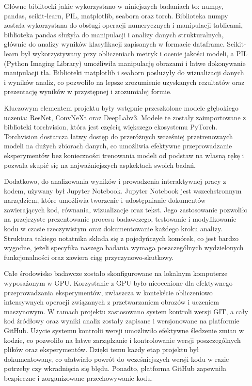 Główne biblitoeki jakie wykorzystano w niniejszych badaniach to: numpy, pandas, scikit-learn, PIL, matplotlib, seaborn oraz torch. Biblioteka numpy została wykorzystana do obsługi operacji numerycznych i manipulacji tablicami, biblioteka 
pandas służyła do manipulacji i analizy danych strukturalnych, głównie do analizy wyników klasyfikacji zapisanych w formacie dataframe. Scikit-learn był wykorzystywany przy obliczeniach metryk i ocenie jakości modeli, a PIL 
(Python Imaging Library) umożliwiła manipulację obrazami i łatwe dokonywanie manipulacji tła. Biblioteki matplotlib i seaborn posłużyły do wizualizacji danych i wyników analiz, co pozwoliło na lepsze zrozumienie uzyskanych rezultatów oraz 
prezentację wyników w przystępnej i zrozumiałej formie.

Kluczowym elementem projektu były wstępnie przeszkolone modele głębokiego uczenia: ResNet, ConvNeXt oraz DeepLabv3. Modele te zostały zaimportowane z biblioteki torchvision, która jest częścią większego ekosystemu PyTorch. Torchvision 
dostarcza łatwy dostęp do przeróżnych wcześniej przetrenowaych modeli na dużych zbiorach danych, co umożliwia efektywne przeprowadzanie eksperymentów bez konieczności trenowania modeli od podstaw na własną rękę i pozwala skupić się na 
najważniejszych aspkektach swoich badań.

Dodatkowo, do analizowania wyników i prowadzenia interaktywnej pracy z kodem, używany był Jupyter Notebook. Jupyter Notebook jest wszechstronnym narzędziem, które umożliwia tworzenie i udostępnianie dokumentów zawierających kod, 
równania, wizualizacje oraz tekst. Jego zastosowanie pozwoliło na przejrzyste prezentowanie procesu badawczego, testowanie i modyfikowanie kodu w czasie rzeczywistym oraz dokumentowanie każdego kroku analizy. Struktura takiego notatnika
składa się z pojedyńczych komórek, co jest bardzo wygodne, jeżeli specyfika naszego badania wymaga poszczególnych wydzielonych funkcjonalności oraz zawiera ciąg przyczynowo-skutkowy.

Całe środowisko badawcze zostało skonfigurowane na lokalnym komputerze wyposażonym w GPU. Korzystanie z GPU było nieocenione dla efektywnego przeprowadzania eksperymentów, zwłaszcza w kontekście obliczeniowo intensywnych operacji związanych z 
przetwarzaniem obrazów i uczeniem maszynowym. W ramach projektu zastosowano system kontroli wersji GIT, a cały kod źródłowy oraz wyniki analiz zostały zapisane i wersjonowane na platformie GitHub. Użycie systemu kontrolii wersji umożliwiło 
efektywne śledzenie zmian w kodzie, co pozwoliło na łatwe zarządzanie i kontrolowanie wersji poszczególnych plików oraz eksperymentów. Dzięki temu każdy etap projektu był dokumentowany, co ułatwiało powrót do wcześniejszych wersji kodu w 
razie potrzeby czy wkradnięcia się błędu. Ponadto, platforma GitHub zapewniła bezpieczne i zorganizowane przechowywanie kodu.

